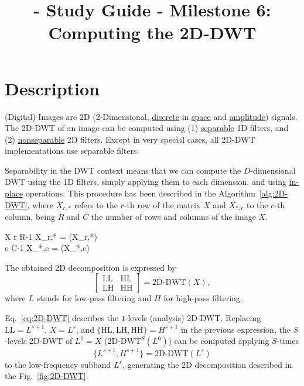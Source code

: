 
\title{\SM{} - Study Guide - Milestone 6: Computing the 2D-DWT}

\maketitle

\section{Description}

(Digital) Images are 2D
(2-Dimensional, \href{https://en.wikipedia.org/wiki/Discrete_time_and_continuous_time}{discrete}
in \href{https://en.wikipedia.org/wiki/Space}{space}
and \href{https://en.wikipedia.org/wiki/Amplitude}{amplitude})
signals. The 2D-DWT of an image can be computed using
(1) \href{https://en.wikipedia.org/wiki/Separable_filter}{separable}
1D filters, and
(2) \href{https://en.wikipedia.org/wiki/Non-separable_wavelet}{nonseparable}
2D filters. Except in very special cases, all 2D-DWT implementations
use separable filters.

Separability in the DWT context means that we can compute the
$D$-dimensional DWT using the 1D filters, simply applying them to each
dimension, and
using \href{https://en.wikipedia.org/wiki/In-place_algorithm}{in-place}
operations. This procedure has been described in the
Algorithm~\ref{alg:2D-DWT}, where $X_{r,*}$ refers to the $r$-th row
of the matrix $X$ and $X_{*,c}$ to the $c$-th column, being $R$ and
$C$ the number of rows and columns of the image $X$.

\begin{pseudocode}{}{X}
  \label{alg:2D-DWT}
  \FOR r  \TO R-1 \DO
  X_{r,*} = (X_{r,*})
  \\
  \FOR c  \TO C-1 \DO
  X_{*,c} = (X_{*,c})
\end{pseudocode}

The obtained 2D decomposition is expressed by
\begin{equation}
  \begin{bmatrix}
    \text{LL} & \text{HL} \\
    \text{LH} & \text{HH}
  \end{bmatrix}
  =
  \text{2D-DWT}(X),
  \label{eq:2D-DWT}
\end{equation}
where $L$ stands for low-pass filtering and $H$ for high-pass
filtering.

Eq.~\ref{eq:2D-DWT} describes the $1$-levels (analysis)
2D-DWT. Replacing $\text{LL}=L^{s+1}$, $X=L^s$, and
$\{\text{HL}, \text{LH}, \text{HH}\}=H^{s+1}$ in the previous
expression, the $S$-levels 2D-DWT of $L^0=X$ ($\text{2D-DWT}^S(L^0)$)
can be computed applying $S$-times
\begin{equation}
  \{L^{s+1}, H^{s+1}\} = \text{2D-DWT}(L^s)
\end{equation}
to the low-frequency subband $L^s$, generating the 2D decomposition
described in the Fig.~\ref{fig:2D-DWT}.

